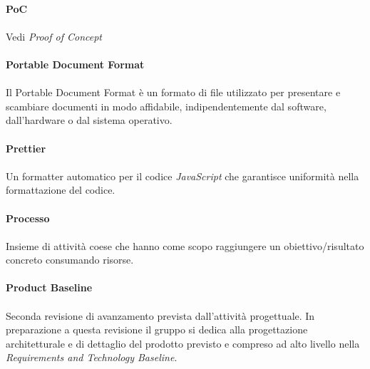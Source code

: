 \documentclass[10pt, a4paper]{article}
\begin{document}
\vspace{2em}
\paragraph{PoC}\noindent\hrulefill
\paragraph{} Vedi \textit{Proof of Concept\pg}

\vspace{2em}
\paragraph{Portable Document Format}\noindent\hrulefill
\paragraph{}Il Portable Document Format è un formato di file utilizzato per presentare e scambiare documenti in modo affidabile, indipendentemente dal software, dall'hardware o dal sistema operativo.

\vspace{2em}
\paragraph{Prettier}\noindent\hrulefill
\paragraph{}Un formatter automatico per il codice \textit{JavaScript\pg} che garantisce uniformità nella formattazione del codice.


\vspace{2em}
\paragraph{Processo}\noindent\hrulefill
\paragraph{}Insieme di attività coese che hanno come scopo raggiungere un obiettivo/risultato concreto consumando risorse.

\vspace{2em}
\paragraph{Product Baseline}\noindent\hrulefill
\paragraph{}Seconda revisione di avanzamento prevista dall’attività progettuale. In preparazione a questa revisione il gruppo si dedica alla progettazione architetturale e di dettaglio del prodotto previsto e compreso ad alto livello nella \textit{Requirements and Technology Baseline\pg}.
\end{document}
